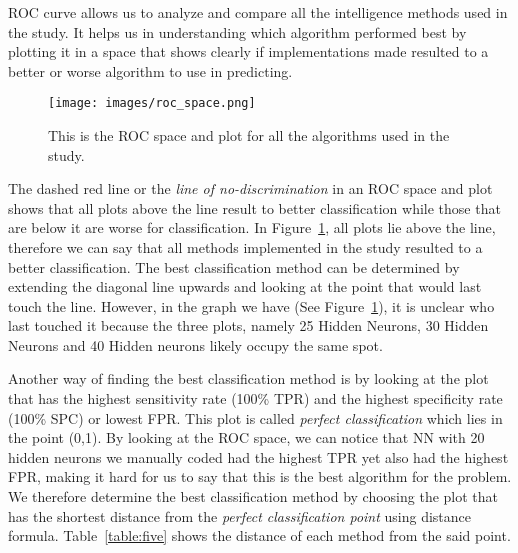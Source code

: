 \documentclass[journal]{./IEEE/IEEEtran}
\begin{document}
\subsubsection {}
ROC curve allows us to analyze and compare all the intelligence methods used in the study. It helps us in understanding which algorithm performed best by plotting it in a space that shows clearly if implementations made resulted to a better or worse algorithm to use in predicting.

\begin{figure}[h]
\begin{center}
\texttt{[image: images/roc\_space.png]}
\caption{This is the ROC space and plot for all the algorithms used in the study.}
\label{fig:rocspace}
\end{center}
\end{figure}

The dashed red line or the {\it line of no-discrimination} in an ROC space and plot shows that all plots above the line result to better classification while those that are below it are worse for classification. In Figure~\ref{fig:rocspace}, all plots lie above the line, therefore we can say that all methods implemented in the study resulted to a better classification. The best classification method can be determined by extending the diagonal line upwards and looking at the point that would last touch the line. However, in the graph we have (See Figure~\ref{fig:rocspace}), it is unclear who last touched it because the three plots, namely 25 Hidden Neurons, 30 Hidden Neurons and 40 Hidden neurons likely occupy the same spot. 

Another way of finding the best classification method is by looking at the plot that has the highest sensitivity rate (100\% TPR) and the highest specificity rate (100\% SPC) or lowest FPR. This plot is called {\it perfect classification} which lies in the point (0,1). By looking at the ROC space, we can notice that NN with 20 hidden neurons we manually coded had the highest TPR yet also had the highest FPR, making it hard for us to say that this is the best algorithm for the problem. We therefore determine the best classification method by choosing the plot that has the shortest distance from the {\it perfect classification point} using distance formula. Table~\ref{table:five} shows the distance of each method from the said point.
\end{document}
